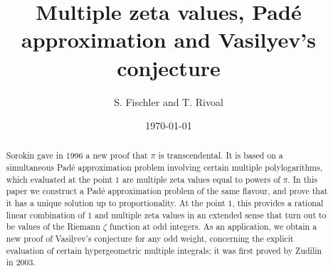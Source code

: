 \documentclass[reqno,12pt]{amsart}
\numberwithin{equation}{section}
\theoremstyle{remark}
\begin{document}
\title[]{Multiple zeta values, Pad\'e approximation and Vasilyev's conjecture}

\author[]{S. Fischler and T. Rivoal}
\date{\today}




\begin{abstract} Sorokin gave in 1996 a new proof that $\pi$ is transcendental. 
It is based on a simultaneous Pad\'e approximation problem involving certain multiple 
polylogarithms, which evaluated at the point $1$ are multiple zeta values equal to powers of $\pi$. 
In this paper we construct a Pad\'e approximation problem  of the same flavour, and prove 
that it has a unique solution up to proportionality. At the point $1$, this provides a 
rational linear combination of $1$ and multiple zeta values in an extended sense that turn 
out to be values of the Riemann $\zeta$ function at odd integers. As an application, we obtain  a new 
proof of Vasilyev's conjecture  for any odd weight, concerning the explicit evaluation of certain 
hypergeometric multiple integrals; it  was first proved by Zudilin in 2003. 
\end{abstract}



\maketitle
\end{document}
